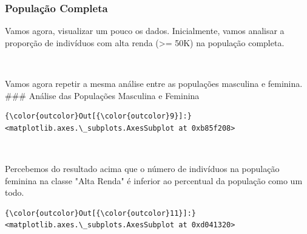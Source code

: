 \documentclass[11pt]{article}
\begin{document}
    \subsubsection{População Completa}\label{populauxe7uxe3o-completa}

Vamos agora, visualizar um pouco os dados. Inicialmente, vamos analisar
a proporção de indivíduos com alta renda (\textgreater{}= 50K) na
população completa.

    \begin{center}
    \end{center}
    { \hspace*{\fill} \\}
    
    Vamos agora repetir a mesma análise entre as populações masculina e
feminina. \#\#\# Análise das Populações Masculina e Feminina

\begin{Verbatim}[commandchars=\\\{\}]
{\color{outcolor}Out[{\color{outcolor}9}]:} <matplotlib.axes.\_subplots.AxesSubplot at 0xb85f208>
\end{Verbatim}
            
    \begin{center}
    \end{center}
    { \hspace*{\fill} \\}
    
    Percebemos do resultado acima que o número de indivíduos na população
feminina na classe "Alta Renda" é inferior ao percentual da população
como um todo.

\begin{Verbatim}[commandchars=\\\{\}]
{\color{outcolor}Out[{\color{outcolor}11}]:} <matplotlib.axes.\_subplots.AxesSubplot at 0xd041320>
\end{Verbatim}
            
    \begin{center}
    \end{center}
    { \hspace*{\fill} \\}
    
\end{document}
